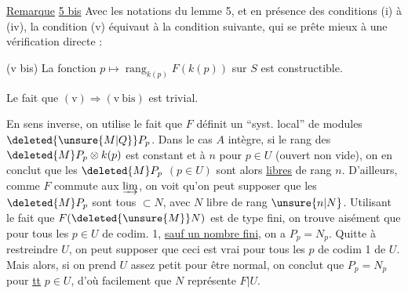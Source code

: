 \uline{Remarque} \uline{5 bis} \quad Avec les notations du lemme 5, et en présence des conditions (i) à (iv), la condition (v) équivaut à la condition suivante, qui se prête mieux à une vérification directe :

(v bis) La fonction $p\longmapsto\operatorname{rang}_{k(p)}F(k(p))$  sur $S$ est constructible. 

Le fait que $(\mathrm v)\Longrightarrow(\mathrm v\ \mathrm{bis})$ est trivial.

En sens inverse, on utilise le fait que $F$ définit un ``syst. local'' de modules $\deleted{\unsure{M|Q}}P_p$. Dans le cas $A$ intègre,  si le rang des $\deleted{M}P_p\otimes k(p)$ est constant et  à $n$ pour $p\in U$ (ouvert non vide),  on en conclut que les $\deleted{M}P_p$ $(p\in U)$ sont alors \uline{libres} de rang $n$. D'ailleurs,  comme $F$ commute aux $\varinjlim$, on voit qu'on peut supposer que les $\deleted{M}P_p$ sont tous $\subset N$, avec $N$ libre de rang $\unsure{n|N}$. Utilisant le fait que  $F(\deleted{\unsure{M}}N)$ est de type fini, on trouve aisément que pour tous les $p\in U$ de codim. 1, \uline{sauf un nombre fini}, on a $P_p=N_p$. Quitte à restreindre $U$, on peut supposer que ceci est vrai pour tous les $p$ de codim 1 de $U$. Mais alors, si on prend $U$ assez petit pour être normal, on conclut que $P_p=N_p$ pour \uline{tt} $p\in U$,  d'où facilement que $N$ représente $F|U$.

